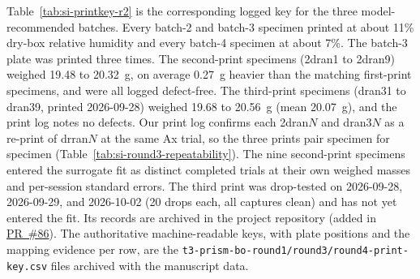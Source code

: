 \documentclass[11pt]{article}
\newcommand{\repo}{https://github.com/vertical-cloud-lab/tensegrity-optimization}
\begin{document}
Table~\ref{tab:si-printkey-r2} is the corresponding logged key for
the three model-recommended batches. Every batch-2 and batch-3
specimen printed at about 11\% dry-box relative humidity and every
batch-4 specimen at about 7\%. The batch-3 plate was printed three
times. The second-print specimens (2dran1 to 2dran9) weighed 19.48 to
\SI{20.32}{g}, on average \SI{0.27}{g} heavier than the matching
first-print specimens, and were all logged defect-free. The third-print
specimens (dran31 to dran39, printed 2026-09-28) weighed 19.68 to
\SI{20.56}{g} (mean \SI{20.07}{g}), and the print log notes no
defects. Our print log confirms each 2dran$N$ and dran3$N$ as a
re-print of drran$N$ at the same Ax trial, so the three prints pair
specimen for specimen (Table~\ref{tab:si-round3-repeatability}). The nine
second-print specimens entered the surrogate fit as distinct completed
trials at their own weighed masses and per-session standard errors.
The third print was drop-tested on \mbox{2026-09-28}, \mbox{2026-09-29}, and
\mbox{2026-10-02} (20 drops each, all captures clean) and has not yet entered
the fit. Its records are archived in the project repository (added in
\href{\repo/pull/86}{PR~\#86}). The
authoritative machine-readable keys, with plate positions and the
mapping evidence per row, are the
\texttt{t3-prism-bo-round1/round3/round4-print-key.csv} files
archived with the manuscript data.
\end{document}
